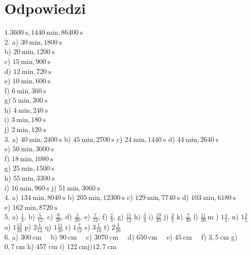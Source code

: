 \documentclass[10pt]{article}
\begin{document}
\section*{Odpowiedzi}
\(1.3600 \mathrm{~s}, 1440 \mathrm{~min}, 86400 \mathrm{~s}\)\\
2. a) \(30 \mathrm{~min}, 1800 \mathrm{~s}\)\\
b) \(20 \mathrm{~min}, 1200 \mathrm{~s}\)\\
c) \(15 \mathrm{~min}, 900 \mathrm{~s}\)\\
d) \(12 \mathrm{~min}, 720 \mathrm{~s}\)\\
e) \(10 \mathrm{~min}, 600 \mathrm{~s}\)\\
f) \(6 \mathrm{~min}, 360 \mathrm{~s}\)\\
g) \(5 \mathrm{~min}, 300 \mathrm{~s}\)\\
h) \(4 \mathrm{~min}, 240 \mathrm{~s}\)\\
i) \(3 \mathrm{~min}, 180 \mathrm{~s}\)\\
j) \(2 \mathrm{~min}, 120 \mathrm{~s}\)\\
3. a) \(40 \mathrm{~min}, 2400 \mathrm{~s}\) b) \(45 \mathrm{~min}, 2700 \mathrm{~s}\) c) \(24 \mathrm{~min}, 1440 \mathrm{~s}\) d) \(44 \mathrm{~min}, 2640 \mathrm{~s}\)\\
e) \(50 \mathrm{~min}, 3000 \mathrm{~s}\)\\
f) \(18 \mathrm{~min}, 1080 \mathrm{~s}\)\\
g) \(25 \mathrm{~min}, 1500 \mathrm{~s}\)\\
h) \(55 \mathrm{~min}, 3300 \mathrm{~s}\)\\
i) \(16 \mathrm{~min}, 960 \mathrm{~s}\) j) \(51 \mathrm{~min}, 3060 \mathrm{~s}\)\\
4. a) \(134 \mathrm{~min}, 8040 \mathrm{~s}\) b) \(205 \mathrm{~min}, 12300 \mathrm{~s}\) c) \(129 \mathrm{~min}, 7740 \mathrm{~s}\) d) \(103 \mathrm{~min}, 6180 \mathrm{~s}\)\\
e) \(162 \mathrm{~min}, 8720 \mathrm{~s}\)\\
5. a) \(\frac{1}{4}\), b) \(\frac{5}{12}\), c) \(\frac{9}{20}\), d) \(\frac{3}{20}\), e) \(\frac{7}{12}\), f) \(\frac{2}{3}\), g) \(\frac{11}{12}\) h) \(\frac{3}{4}\) i) \(\frac{19}{20}\) j) \(\frac{2}{5}\) k) \(\frac{7}{30}\) l) \(\frac{11}{30} \mathrm{~m}\) ) \(1 \frac{4}{5}\), n) \(1 \frac{3}{5}\) o) \(1 \frac{13}{20}\) p) \(2 \frac{1}{12}\) q) \(1 \frac{11}{20}\) r) \(1 \frac{7}{12}\) s) \(3 \frac{1}{10}\) t) \(2 \frac{3}{20}\)\\
6. a) \(300 \mathrm{~cm} \quad\) b) \(90 \mathrm{~cm} \quad\) c) \(3070 \mathrm{~cm} \quad\) d) \(650 \mathrm{~cm} \quad\) e) \(45 \mathrm{~cm} \quad\) f) \(3,5 \mathrm{~cm}\) g) \(0,7 \mathrm{~cm}\) h) 457 cm i) \(122 \mathrm{~cm} \mathrm{j)} 12,7 \mathrm{~cm}\)\\
\end{document}
